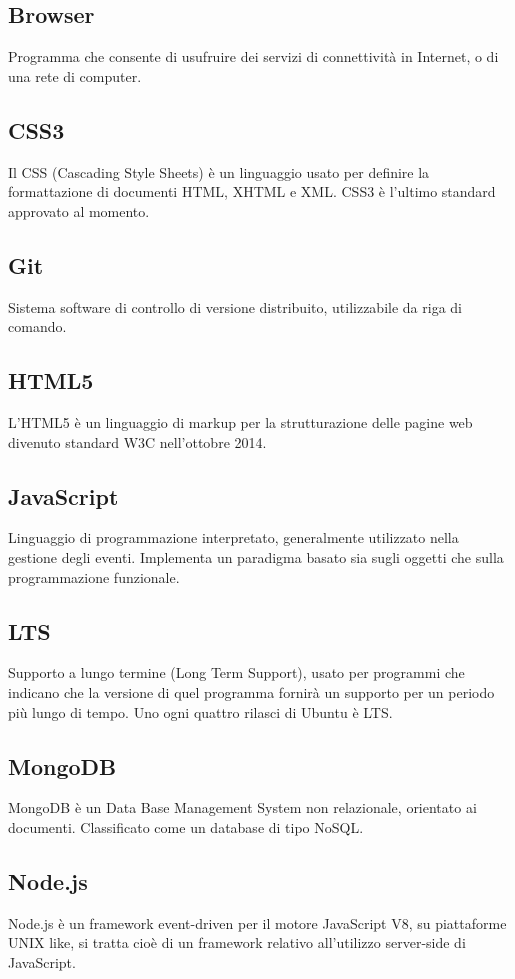 \documentclass[a4paper, titlepage]{article}
\begin{document}
	\subsection{Browser}
	Programma che consente di usufruire dei servizi di connettività in Internet, o di una rete di computer.
	
	\subsection{CSS3}
	Il CSS (Cascading Style Sheets) è un linguaggio usato per definire la formattazione di documenti HTML, XHTML e XML. CSS3 è l’ultimo standard approvato al momento.
	
	\subsection{Git}
	Sistema software di controllo di versione distribuito, utilizzabile da riga di comando.
	
	\subsection{HTML5}
	L’HTML5 è un linguaggio di markup per la strutturazione delle pagine web divenuto standard W3C nell’ottobre 2014.
	
	\subsection{JavaScript}
	Linguaggio di programmazione interpretato, generalmente utilizzato nella gestione degli eventi.
	Implementa un paradigma basato sia sugli oggetti che sulla programmazione funzionale.
	
	\subsection{LTS}
	 Supporto a lungo termine (Long Term Support), usato per programmi che indicano che la versione di quel programma fornirà un supporto per un periodo più lungo di tempo. Uno ogni quattro rilasci di Ubuntu è LTS.
	
	\subsection{MongoDB}
	MongoDB è un Data Base Management System non relazionale, orientato ai documenti. Classificato come un database di tipo NoSQL.
	
	\subsection{Node.js}
	Node.js è un framework event-driven per il motore JavaScript V8, su piattaforme UNIX like, si tratta cioè di un framework relativo all'utilizzo server-side di JavaScript.
	
\end{document}

